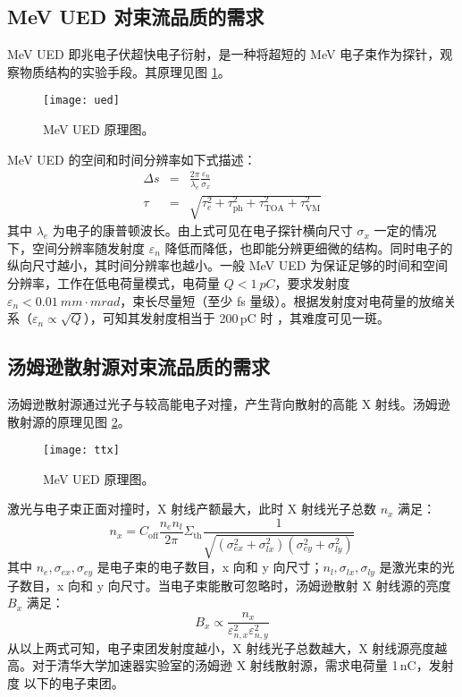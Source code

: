 \subsection{MeV UED 对束流品质的需求}
MeV UED 即兆电子伏超快电子衍射，是一种将超短的 MeV 电子束作为探针，观察物质结构的实验手段。其原理见图 \ref{fig:ued}。
\begin{figure}[htbp]
\centering
\texttt{[image: ued]}
\caption{\label{fig:ued} MeV UED 原理图\cite{Li:aa}。}
\end{figure}

MeV UED 的空间和时间分辨率如下式描述\cite{Weathersby:2015aa}：
\begin{eqnarray}
\Delta s &=& \frac{2\pi}{\lambda_e}\frac{\varepsilon_n}{\sigma_x}\\
\tau &=& \sqrt{\tau_e^2+\tau_{\text{ph}}^2+\tau_{\text{TOA}}^2+\tau_{\text{VM}}^2}
\end{eqnarray}
其中 $\lambda_e$ 为电子的康普顿波长。由上式可见在电子探针横向尺寸 $\sigma_x$ 一定的情况下，空间分辨率随发射度 $\varepsilon_{n}$ 降低而降低，也即能分辨更细微的结构。同时电子的纵向尺寸越小，其时间分辨率也越小。一般 MeV UED 为保证足够的时间和空间分辨率，工作在低电荷量模式，电荷量 $Q < \SI{1}{pC}$，要求发射度 $\varepsilon_{n} < \SI{0.01}{mm\cdot mrad}$，束长尽量短（至少 fs 量级）。根据发射度对电荷量的放缩关系（$\varepsilon_n\propto\sqrt{Q}$），可知其发射度相当于 200\,pC 时 ，其难度可见一斑。

\subsection{汤姆逊散射源对束流品质的需求}
汤姆逊散射源通过光子与较高能电子对撞，产生背向散射的高能 X 射线\cite{Milburn:1963aa,Fiocco:1963aa}。汤姆逊散射源的原理见图 \ref{fig:ttx}。
\begin{figure}[htbp]
\centering
\texttt{[image: ttx]}
\caption{\label{fig:ttx} MeV UED 原理图。}
\end{figure}

激光与电子束正面对撞时，X 射线产额最大，此时 X 射线光子总数 $n_x$ 满足\cite{huangwenhui:2004aa}：
\begin{equation}
n_x = C_{\text{off}}\frac{n_en_l}{2\pi}\Sigma_{\text{th}}\frac{1}{\sqrt{(\sigma_{ex}^2+\sigma_{lx}^2)(\sigma_{ey}^2+\sigma_{ly}^2)}}
\end{equation}
其中 $n_e, \sigma_{ex}, \sigma_{ey}$ 是电子束的电子数目，x 向和 y 向尺寸；$n_l, \sigma_{lx}, \sigma_{ly}$ 是激光束的光子数目，x 向和 y 向尺寸。当电子束能散可忽略时，汤姆逊散射 X 射线源的亮度 $B_x$ 满足\cite{duyingchao:2006aa}：
\begin{equation}
B_x \propto \frac{n_x}{\varepsilon_{n, x}^2\varepsilon_{n, y}^2}
\end{equation}
从以上两式可知，电子束团发射度越小，X 射线光子总数越大，X 射线源亮度越高。对于清华大学加速器实验室的汤姆逊 X 射线散射源，需求电荷量 1\,nC，发射度  以下的电子束团\cite{Qian:2012aa}。

